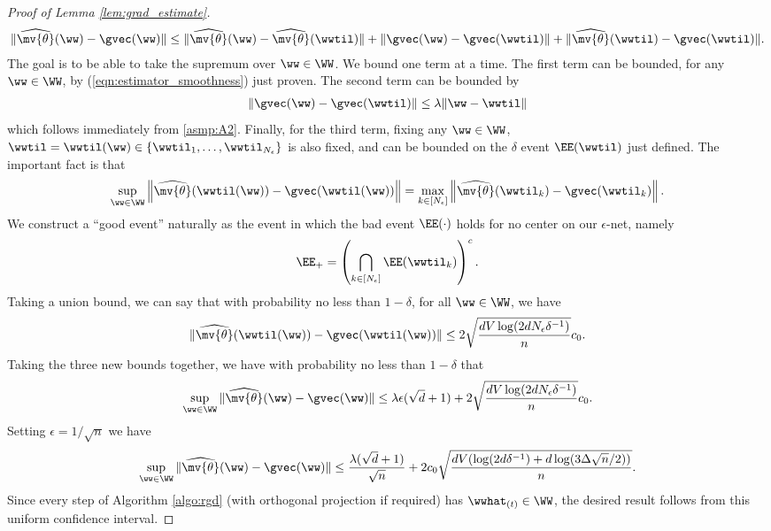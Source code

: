 \documentclass[11pt,oneside]{article}
\theoremstyle{definition} \newtheorem{defn}{Definition}       %
\theoremstyle{plain} \newtheorem{prop}[defn]{Proposition}           %
\theoremstyle{plain} \newtheorem{thm}[defn]{Theorem}                %
\theoremstyle{plain} \newtheorem{lem}[defn]{Lemma}                  %
\theoremstyle{plain} \newtheorem{cor}[defn]{Corollary}              %
\theoremstyle{remark} \newtheorem{rmk}[defn]{Remark}                %
\theoremstyle{remark} \newtheorem{ex}[defn]{Example}                %
\begin{document}
\begin{proof}[Proof of Lemma \ref{lem:grad_estimate}]
\begin{align}
\|\widehat{\mv{\theta}}(\ww) - \gvec(\ww)\| \leq \|\widehat{\mv{\theta}}(\ww)-\widehat{\mv{\theta}}(\wwtil)\| + \|\gvec(\ww) - \gvec(\wwtil)\| + \|\widehat{\mv{\theta}}(\wwtil) - \gvec(\wwtil)\|.
\end{align}
%
The goal is to be able to take the supremum over $\ww \in \WW$. We bound one term at a time. The first term can be bounded, for any $\ww \in \WW$, by (\ref{eqn:estimator_smoothness}) just proven. The second term can be bounded by
%
\begin{align}\label{eqn:bound_error2}
\|\gvec(\ww) - \gvec(\wwtil)\| \leq \lambda\|\ww - \wwtil\|
\end{align}
%
which follows immediately from \ref{asmp:A2}. Finally, for the third term, fixing any $\ww \in \WW$, $\wwtil=\wwtil(\ww) \in \{\wwtil_{1},\ldots,\wwtil_{N_{\epsilon}}\}$ is also fixed, and can be bounded on the $\delta$ event $\EE(\wwtil)$ just defined. The important fact is that
%
\begin{align*}
\sup_{\ww \in \WW} \left\|\widehat{\mv{\theta}}(\wwtil(\ww)) - \gvec(\wwtil(\ww)) \right\| = \max_{k \in [N_{\epsilon}]} \left\|\widehat{\mv{\theta}}(\wwtil_{k}) - \gvec(\wwtil_{k}) \right\|.
\end{align*}
%
We construct a ``good event'' naturally as the event in which the bad event $\EE(\cdot)$ holds for no center on our $\epsilon$-net, namely 
%
\begin{align*}
\EE_{+} = \left(\bigcap_{k \in [N_{\epsilon}]} \EE(\wwtil_{k}) \right)^{c}.
\end{align*}
%
Taking a union bound, we can say that with probability no less than $1-\delta$, for all $\ww \in \WW$, we have
%
\begin{align}\label{eqn:bound_error3}
\|\widehat{\mv{\theta}}(\wwtil(\ww)) - \gvec(\wwtil(\ww))\| \leq 2 \sqrt{\frac{dV\log(2d N_{\epsilon} \delta^{-1})}{n}} c_{0}.
\end{align}
%
Taking the three new bounds together, we have with probability no less than $1-\delta$ that
%
\begin{align*}
\sup_{\ww \in \WW} \|\widehat{\mv{\theta}}(\ww) - \gvec(\ww)\| \leq \lambda\epsilon(\sqrt{d}+1) + 2 \sqrt{\frac{dV\log(2d N_{\epsilon} \delta^{-1})}{n}} c_{0}.
\end{align*}
%
Setting $\epsilon = 1/\sqrt{n}$ we have
%
\begin{align*}
\sup_{\ww \in \WW} \|\widehat{\mv{\theta}}(\ww) - \gvec(\ww)\| \leq \frac{\lambda(\sqrt{d}+1)}{\sqrt{n}} + 2c_{0} \sqrt{\frac{dV(\log(2d\delta^{-1}) + d\log(3\Delta\sqrt{n}/2))}{n}}.
\end{align*}
%
Since every step of Algorithm \ref{algo:rgd} (with orthogonal projection if required) has $\wwhat_{(t)} \in \WW$, the desired result follows from this uniform confidence interval.
\end{proof}
\end{document}
